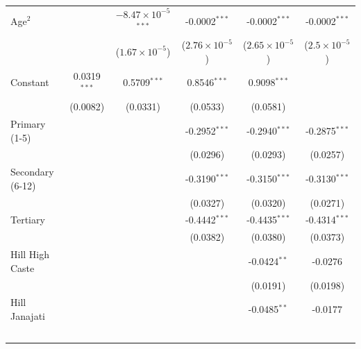 \begin{tabular}{lccccc}
   Age$^2$                        &                         & $-8.47\times 10^{-5}$$^{***}$  & -0.0002$^{***}$         & -0.0002$^{***}$         & -0.0002$^{***}$\\   
                                  &                         & ($1.67\times 10^{-5}$)         & ($2.76\times 10^{-5}$)  & ($2.65\times 10^{-5}$)  & ($2.5\times 10^{-5}$)\\    
   Constant                       & 0.0319$^{***}$          & 0.5709$^{***}$                 & 0.8546$^{***}$          & 0.9098$^{***}$          &   \\   
                                  & (0.0082)                & (0.0331)                       & (0.0533)                & (0.0581)                &   \\   
   Primary (1-5)                  &                         &                                & -0.2952$^{***}$         & -0.2940$^{***}$         & -0.2875$^{***}$\\   
                                  &                         &                                & (0.0296)                & (0.0293)                & (0.0257)\\   
   Secondary (6-12)               &                         &                                & -0.3190$^{***}$         & -0.3150$^{***}$         & -0.3130$^{***}$\\   
                                  &                         &                                & (0.0327)                & (0.0320)                & (0.0271)\\   
   Tertiary                       &                         &                                & -0.4442$^{***}$         & -0.4435$^{***}$         & -0.4314$^{***}$\\   
                                  &                         &                                & (0.0382)                & (0.0380)                & (0.0373)\\   
   Hill High Caste                &                         &                                &                         & -0.0424$^{**}$          & -0.0276\\   
                                  &                         &                                &                         & (0.0191)                & (0.0198)\\   
   Hill Janajati                  &                         &                                &                         & -0.0485$^{**}$          & -0.0177\\   
$$
\end{tabular}
